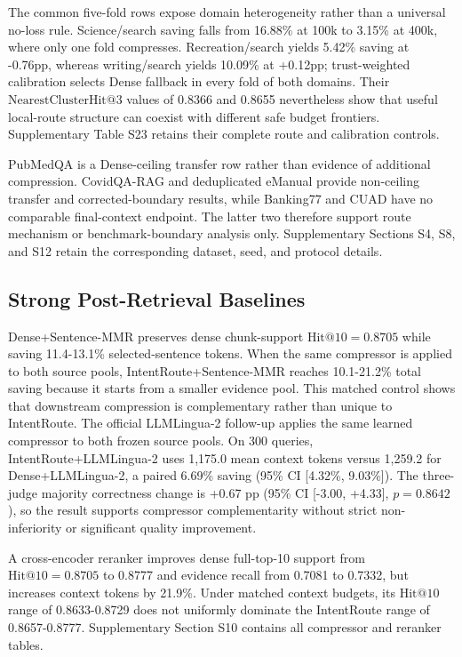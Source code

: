 The common five-fold rows expose domain heterogeneity rather than a universal no-loss rule. Science/search saving falls from 16.88\% at 100k to 3.15\% at 400k, where only one fold compresses. Recreation/search yields 5.42\% saving at -0.76pp, whereas writing/search yields 10.09\% at +0.12pp; trust-weighted calibration selects Dense fallback in every fold of both domains. Their $\mathrm{NearestClusterHit@3}$ values of 0.8366 and 0.8655 nevertheless show that useful local-route structure can coexist with different safe budget frontiers. Supplementary Table S23 retains their complete route and calibration controls.

PubMedQA is a Dense-ceiling transfer row rather than evidence of additional compression. CovidQA-RAG and deduplicated eManual provide non-ceiling transfer and corrected-boundary results, while Banking77 and CUAD have no comparable final-context endpoint. The latter two therefore support route mechanism or benchmark-boundary analysis only. Supplementary Sections S4, S8, and S12 retain the corresponding dataset, seed, and protocol details.

\subsection{Strong Post-Retrieval Baselines}
\label{sec:06-results:strong-post-retrieval-baselines}

Dense+Sentence-MMR preserves dense chunk-support $\mathrm{Hit@10}=0.8705$ while saving 11.4-13.1\% selected-sentence tokens. When the same compressor is applied to both source pools, IntentRoute+Sentence-MMR reaches 10.1-21.2\% total saving because it starts from a smaller evidence pool. This matched control shows that downstream compression is complementary rather than unique to IntentRoute. The official LLMLingua-2 follow-up applies the same learned compressor to both frozen source pools. On 300 queries, IntentRoute+LLMLingua-2 uses 1,175.0 mean context tokens versus 1,259.2 for Dense+LLMLingua-2, a paired 6.69\% saving (95\% CI [4.32\%, 9.03\%]). The three-judge majority correctness change is +0.67 pp (95\% CI [-3.00, +4.33], $p=0.8642$), so the result supports compressor complementarity without strict non-inferiority or significant quality improvement.

A cross-encoder reranker improves dense full-top-10 support from $\mathrm{Hit@10}=0.8705$ to 0.8777 and evidence recall from 0.7081 to 0.7332, but increases context tokens by 21.9\%. Under matched context budgets, its $\mathrm{Hit@10}$ range of 0.8633-0.8729 does not uniformly dominate the IntentRoute range of 0.8657-0.8777. Supplementary Section S10 contains all compressor and reranker tables.

